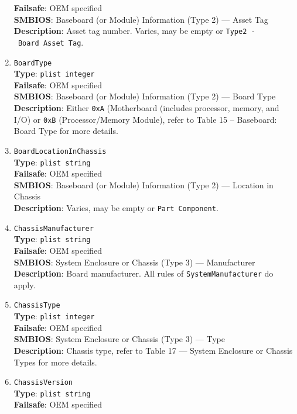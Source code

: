 \documentclass[]{article}
\begin{document}
\begin{enumerate}
  \textbf{Failsafe}: OEM specified\\
  \textbf{SMBIOS}: Baseboard (or Module) Information (Type 2) --- Asset
  Tag\\
  \textbf{Description}: Asset tag number. Varies, may be empty or
  \texttt{Type2\ -\ Board\ Asset\ Tag}.
\item
  \texttt{BoardType}\\
  \textbf{Type}: \texttt{plist\ integer}\\
  \textbf{Failsafe}: OEM specified\\
  \textbf{SMBIOS}: Baseboard (or Module) Information (Type 2) --- Board
  Type\\
  \textbf{Description}: Either \texttt{0xA} (Motherboard (includes
  processor, memory, and I/O) or \texttt{0xB} (Processor/Memory Module),
  refer to Table 15 -- Baseboard: Board Type for more details.
\item
  \texttt{BoardLocationInChassis}\\
  \textbf{Type}: \texttt{plist\ string}\\
  \textbf{Failsafe}: OEM specified\\
  \textbf{SMBIOS}: Baseboard (or Module) Information (Type 2) --- Location
  in Chassis\\
  \textbf{Description}: Varies, may be empty or
  \texttt{Part\ Component}.
\item
  \texttt{ChassisManufacturer}\\
  \textbf{Type}: \texttt{plist\ string}\\
  \textbf{Failsafe}: OEM specified\\
  \textbf{SMBIOS}: System Enclosure or Chassis (Type 3) --- Manufacturer\\
  \textbf{Description}: Board manufacturer. All rules of
  \texttt{SystemManufacturer} do apply.
\item
  \texttt{ChassisType}\\
  \textbf{Type}: \texttt{plist\ integer}\\
  \textbf{Failsafe}: OEM specified\\
  \textbf{SMBIOS}: System Enclosure or Chassis (Type 3) --- Type\\
  \textbf{Description}: Chassis type, refer to Table 17 --- System
  Enclosure or Chassis Types for more details.
\item
  \texttt{ChassisVersion}\\
  \textbf{Type}: \texttt{plist\ string}\\
  \textbf{Failsafe}: OEM specified\\

\end{enumerate}
\end{document}
